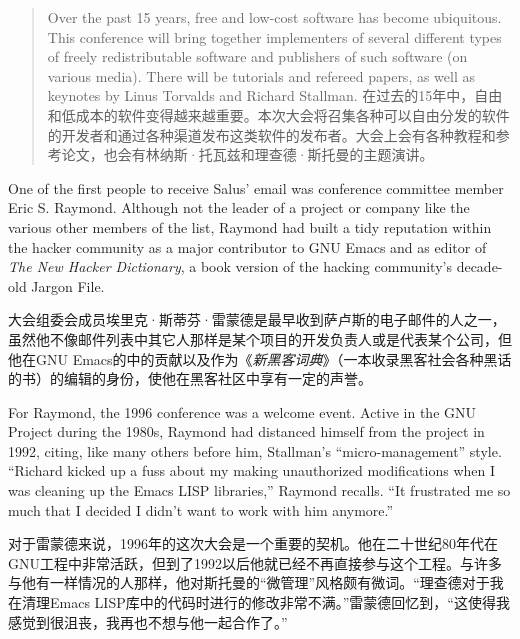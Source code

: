 \begin{quote}
\ifdefined\eng
Over the past 15 years, free and low-cost software has become ubiquitous. This conference will bring together implementers of several different types of freely redistributable software and publishers of such software (on various media). There will be tutorials and refereed papers, as well as keynotes by Linus Torvalds and Richard Stallman.
\fi
\ifdefined\chs
在过去的15年中，自由和低成本的软件变得越来越重要。本次大会将召集各种可以自由分发的软件的开发者和通过各种渠道发布这类软件的发布者。大会上会有各种教程和参考论文，也会有林纳斯·托瓦兹和理查德·斯托曼的主题演讲。
\fi
\end{quote}

\ifdefined\eng
One of the first people to receive Salus' email was conference committee member Eric S. Raymond. Although not the leader of a project or company like the various other members of the list, Raymond had built a tidy reputation within the hacker community as a major contributor to GNU Emacs and as editor of \textit{The New Hacker Dictionary}, a book version of the hacking community's decade-old Jargon File.
\fi

\ifdefined\chs
大会组委会成员埃里克·斯蒂芬·雷蒙德是最早收到萨卢斯的电子邮件的人之一，虽然他不像邮件列表中其它人那样是某个项目的开发负责人或是代表某个公司，但他在GNU Emacs的中的贡献以及作为《\textit{新黑客词典}》（一本收录黑客社会各种黑话的书）的编辑的身份，使他在黑客社区中享有一定的声誉。
\fi

\ifdefined\eng
For Raymond, the 1996 conference was a welcome event. Active in the GNU Project during the 1980s, Raymond had distanced himself from the project in 1992, citing, like many others before him, Stallman's ``micro-management'' style. ``Richard kicked up a fuss about my making unauthorized modifications when I was cleaning up the Emacs LISP libraries,'' Raymond recalls. ``It frustrated me so much that I decided I didn't want to work with him anymore.''
\fi

\ifdefined\chs
对于雷蒙德来说，1996年的这次大会是一个重要的契机。他在二十世纪80年代在GNU工程中非常活跃，但到了1992以后他就已经不再直接参与这个工程。与许多与他有一样情况的人那样，他对斯托曼的``微管理''风格颇有微词。``理查德对于我在清理Emacs LISP库中的代码时进行的修改非常不满。''雷蒙德回忆到，``这使得我感觉到很沮丧，我再也不想与他一起合作了。''
\fi

